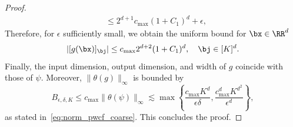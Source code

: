 \documentclass[11pt]{article}
\begin{document}
\begin{proof}
\begin{equation*}
\begin{aligned}
            &\leq 2^{d+1}c_{\max}(1+C_1)^d +   \epsilon,
        \end{aligned}
    \end{equation*}
    Therefore, for $\epsilon$ sufficiently small, we obtain the uniform bound for $\bx \in \RR^d$
    \begin{equation*}
        |[g(\bx)]_{\bj}| \leq c_{\max}  2^{d+2} (1 + C_1)^d, \quad \bj \in [K]^d.
    \end{equation*}
    Finally, the input dimension, output dimension, and width of $g$ coincide with those of $\psi$. Moreover, $\|\theta(g)\|_{\infty}$ is bounded by 
    \begin{equation*}
        B_{\epsilon, \delta, K} \leq c_{\max} \|\theta(\psi)\|_{\infty} \lesssim \max \left\{ \frac{c_{\max} K^{d}}{\epsilon \delta}, \frac{c_{\max}^d K^{d^2}}{\epsilon^d}\right\},
    \end{equation*}
    as stated in~\eqref{eq:norm_pwcf_coarse}. This concludes the proof.
\end{proof}
\end{document}

